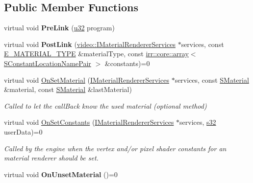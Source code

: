 \subsection*{Public Member Functions}
\begin{DoxyCompactItemize}
\item 
virtual void {\bfseries Pre\+Link} (\hyperlink{namespaceirr_a0416a53257075833e7002efd0a18e804}{u32} program)\hypertarget{classirr_1_1video_1_1IShaderConstantSetCallBack_ae8b9192f8ea9e4df1f55852dce572cf8}{}\label{classirr_1_1video_1_1IShaderConstantSetCallBack_ae8b9192f8ea9e4df1f55852dce572cf8}

\item 
virtual void {\bfseries Post\+Link} (\hyperlink{classirr_1_1video_1_1IMaterialRendererServices}{video\+::\+I\+Material\+Renderer\+Services} $\ast$services, const \hyperlink{namespaceirr_1_1video_ac8e9b6c66f7cebabd1a6d30cbc5430f1}{E\+\_\+\+M\+A\+T\+E\+R\+I\+A\+L\+\_\+\+T\+Y\+PE} \&material\+Type, const \hyperlink{classirr_1_1core_1_1array}{irr\+::core\+::array}$<$ \hyperlink{structirr_1_1video_1_1SConstantLocationNamePair}{S\+Constant\+Location\+Name\+Pair} $>$ \&constants)=0\hypertarget{classirr_1_1video_1_1IShaderConstantSetCallBack_ab31bb771e2f442c91f18bb1fd96da0de}{}\label{classirr_1_1video_1_1IShaderConstantSetCallBack_ab31bb771e2f442c91f18bb1fd96da0de}

\item 
virtual void \hyperlink{classirr_1_1video_1_1IShaderConstantSetCallBack_a68acab7c06fc7893b280fda8dad806f0}{On\+Set\+Material} (\hyperlink{classirr_1_1video_1_1IMaterialRendererServices}{I\+Material\+Renderer\+Services} $\ast$services, const \hyperlink{classirr_1_1video_1_1SMaterial}{S\+Material} \&material, const \hyperlink{classirr_1_1video_1_1SMaterial}{S\+Material} \&last\+Material)
\begin{DoxyCompactList}\small\item\em Called to let the call\+Back know the used material (optional method) \end{DoxyCompactList}\item 
virtual void \hyperlink{classirr_1_1video_1_1IShaderConstantSetCallBack_a91cf4eb8d20d278defaca4e3c9390396}{On\+Set\+Constants} (\hyperlink{classirr_1_1video_1_1IMaterialRendererServices}{I\+Material\+Renderer\+Services} $\ast$services, \hyperlink{namespaceirr_ac66849b7a6ed16e30ebede579f9b47c6}{s32} user\+Data)=0
\begin{DoxyCompactList}\small\item\em Called by the engine when the vertex and/or pixel shader constants for an material renderer should be set. \end{DoxyCompactList}\item 
virtual void {\bfseries On\+Unset\+Material} ()=0\hypertarget{classirr_1_1video_1_1IShaderConstantSetCallBack_af0cd8ec4b7dfa7dd3dcc982b32733aa4}{}\label{classirr_1_1video_1_1IShaderConstantSetCallBack_af0cd8ec4b7dfa7dd3dcc982b32733aa4}

\end{DoxyCompactItemize}
